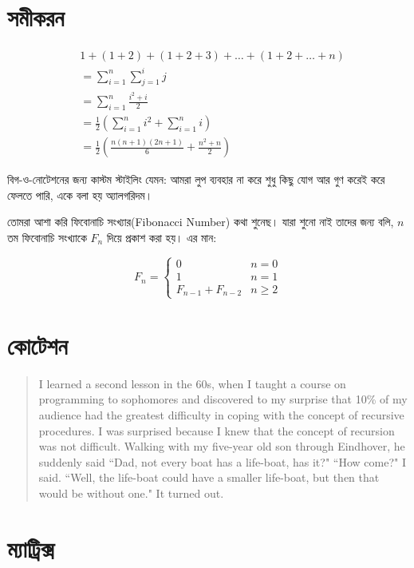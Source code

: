 \section{সমীকরন}

\begin{align*}
& 1 + (1 + 2) + (1 + 2 + 3) + \ldots + (1 + 2 + \ldots + n) \\
&= \sum_{i = 1}^{n} {\sum_{j = 1}^{i} {j}} \\
&= \sum_{i = 1}^{n} { \frac{i^2 + i}{2} } \\
&= \frac{1}{2} \left( \sum_{i = 1}^{n} {i^2} + \sum_{i = 1}^{n} {i} \right) \\
&= \frac{1}{2} \left( \frac{n(n + 1)(2n + 1)}{6} + \frac{n^2 + n}{2} \right)
\end{align*}

বিগ-ও-নোটেশনের জন্য কাস্টম স্টাইলিং যেমন: আমরা লুপ ব্যবহার না করে শুধু কিছু যোগ আর গুণ করেই করে ফেলতে পারি, একে বলা হয়  অ্যালগরিদম।

তোমরা আশা করি ফিবোনাচি সংখ্যার(Fibonacci Number) কথা শুনেছ। যারা শুনো নাই তাদের জন্য বলি, $n$তম ফিবোনাচি সংখ্যাকে $F_n$ দিয়ে প্রকাশ করা হয়। এর মান:

\[
	F_n =
	\begin{cases}
		0  & n = 0 \\
		1 & n = 1 \\
		F_{n - 1} + F_{n - 2} & n \geq 2
	\end{cases}
\]

\section{কোটেশন}

{\selectfont
\begin{quotation}
I learned a second lesson in the 60s, when I taught a course on programming to sophomores and discovered to my surprise that 10\% of my audience had the greatest difficulty in coping with the concept of recursive procedures. I was surprised because I knew that the concept of recursion was not difficult. Walking with my five-year old son through Eindhover, he suddenly said ``Dad, not every boat has a life-boat, has it?" ``How come?" I said. ``Well, the life-boat could have a smaller life-boat, but then that would be without one." It turned out.
\end{quotation}
}

\section{ম্যাট্রিক্স}

